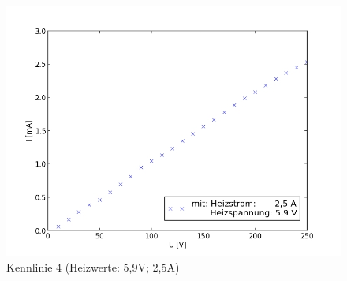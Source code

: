 	\begin{figure}[h]
		\begin{center}
		\includegraphics[scale=0.75]{pica4.jpg}
		\caption{Kennlinie 4 (Heizwerte: 5,9V; 2,5A)}
		\label{pica4}
		\end{center}	
	\end{figure}